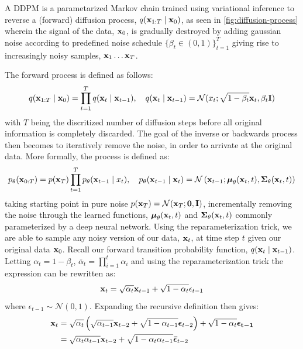 A DDPM is a parametarized Markov chain trained using variational inference to reverse a (forward) diffusion process, $q(\boldsymbol{\mathbf{x}}_{1:T} \mid \boldsymbol{\mathbf{x}}_0)$, as seen in \cref{fig:diffusion-process} wherein the signal of the data, $\boldsymbol{\mathbf{x}}_0$, is gradually destroyed by adding gaussian noise according to predefined noise schedule $\{\beta_t  \in (0,1) \}_{t=1}^T$ giving rise to increasingly noisy samples, $\boldsymbol{\mathbf{x}}_1 \ldots \boldsymbol{\mathbf{x}}_T$. 

The forward process is defined as follows:
\begin{equation}    
    q(\boldsymbol{\mathbf{x}}_{1:T} \mid \boldsymbol{\mathbf{x}}_{0}) = \prod_{t=1}^T q(\boldsymbol{\mathbf{x}}_{t} \mid \boldsymbol{\mathbf{x}}_{t-1}), \quad q(\boldsymbol{\mathbf{x}}_{t} \mid \boldsymbol{\mathbf{x}}_{t-1}) = \mathcal{N}(x_{t}; \sqrt{1 - \beta_t}\boldsymbol{\mathbf{x}}_t,\beta_t \boldsymbol{\mathbf{I}} )
    \label{eq:diffusion}
\end{equation}
with $T$ being the discritized number of diffusion steps before all original information is completely discarded. The goal of the inverse or backwards process then becomes to iteratively remove the noise, in order to arrivate at the original data. More formally, the process is defined as:
\begin{equation}
    p_\theta(\boldsymbol{\mathbf{x}}_{0:T}) = p(\boldsymbol{\mathbf{x}}_T) \prod_{t=1}^T p_\theta(\boldsymbol{\mathbf{x}}_{t-1} \mid x_{t}), \quad p_\theta(\boldsymbol{\mathbf{x}}_{t-1} \mid \boldsymbol{\mathbf{x}}_{t}) = \mathcal{N}\left(\boldsymbol{\mathbf{x}}_{t-1}; \boldsymbol{\mathbf{\mu}}_\theta(\boldsymbol{\mathbf{x}}_t, t), \boldsymbol{\mathbf{\Sigma}}_\theta(\boldsymbol{\mathbf{x}}_t, t) \right)
\end{equation}
taking starting point in pure noise $p(\boldsymbol{\mathbf{x}}_T) = \mathcal{N}(\boldsymbol{\mathbf{x}}_T; \boldsymbol{\mathbf{0}}, \boldsymbol{\mathbf{I}})$, incrementally removing the noise through the learned functions, $\boldsymbol{\mathbf{\mu}}_\theta(\boldsymbol{\mathbf{x}}_t, t)$ and $\boldsymbol{\mathbf{\Sigma}}_\theta(\boldsymbol{\mathbf{x}}_t, t)$ commonly parameterized by a deep neural network.
Using the reparameterization trick, we are able to sample any noisy version of our data, $\boldsymbol{\mathbf{x}}_t$, at time step $t$ given our original data $\boldsymbol{\mathbf{x}}_0$. Recall our forward transition probability function, $q(\boldsymbol{\mathbf{x}}_t \mid \boldsymbol{\mathbf{x}}_{t-1})$. Letting $\alpha_t = 1 - \beta_t$, $\bar{\alpha}_t = \prod_{i=1}^t \alpha_i$ and using the reparameterization trick the expression can be rewritten as:
\begin{equation}
    \boldsymbol{\mathbf{x}}_t = \sqrt{\alpha_t} \boldsymbol{\mathbf{x}}_{t-1} + \sqrt{1 - \alpha_t} \epsilon_{t-1}
\end{equation}
where $\epsilon_{t-1} \sim \mathcal{N}(0,1)$. Expanding the recursive definition then gives:
\begin{align*}
    \vect{x}_t    %
                    & = \sqrt{\alpha_t} \left( \sqrt{\alpha_{t-1}} \vect{x}_{t-2} + \sqrt{1 - \alpha_{t-1}} \vect{\epsilon}_{t-2} \right) + \sqrt{1 - \alpha_t} \vect{\epsilon_{t-1}} \\
                    & = \sqrt{\alpha_t \alpha_{t-1}} \vect{x}_{t-2} + \sqrt{1 - \alpha_{t}\alpha_{t-1}} \vect{\bar{\epsilon}}_{t-2}
\end{align*}

